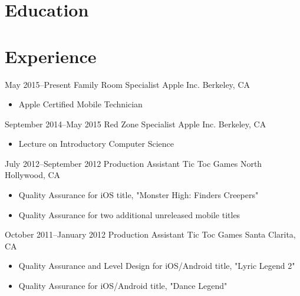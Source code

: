 \documentclass[11pt,a4paper,sans]{moderncv}        %
\begin{document}
\makecvtitle

\section{Education}

\section{Experience}		%
\cventry
{May 2015--Present}    {Family Room Specialist}
{Apple Inc.}    {Berkeley, CA}
{}
{
  \begin{itemize}
  \item Apple Certified Mobile Technician
  \end{itemize}
}

\cventry
{September 2014--May 2015}	{Red Zone Specialist}
{Apple Inc.}	{Berkeley, CA}
{}
{
  \begin{itemize}
  \item Lecture on Introductory Computer Science
  \end{itemize}
}	%

\cventry
{July 2012--September 2012}	{Production Assistant}
{Tic Toc Games}	{North Hollywood, CA}
{}
{
  \begin{itemize}
  \item Quality Assurance for iOS title, "Monster High: Finders Creepers"
  \item Quality Assurance for two additional unreleased mobile titles
  \end{itemize}
}	%

\cventry
{October 2011--January 2012}	{Production Assistant}
{Tic Toc Games}	{Santa Clarita, CA}
{}
{
  \begin{itemize}
  \item Quality Assurance and Level Design for iOS/Android title, "Lyric Legend 2"
  \item Quality Assurance for iOS/Android title, "Dance Legend"
  \end{itemize}
}	%
\end{document}
